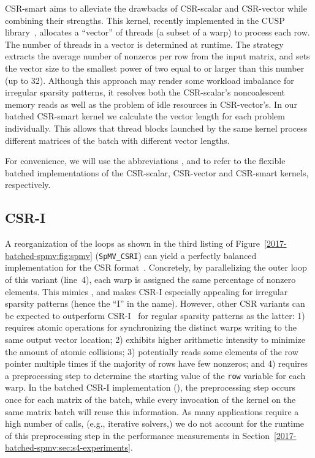 CSR-smart aims to alleviate the drawbacks of CSR-scalar and CSR-vector
while combining their strengths.
This kernel, recently implemented in the CUSP library~\cite{cusp},
allocates a ``vector'' of threads (a subset of a warp) to process each row.
The number of threads in a vector is determined at runtime.
The strategy extracts the average number of nonzeros per row from the input matrix,
and sets the vector size to the smallest power of two
equal to or larger than this number (up to 32).
Although this approach may render some workload imbalance for irregular sparsity patterns,
it resolves both the CSR-scalar's noncoalescent memory reads
as well as the problem of idle resources in CSR-vector's.
In our batched CSR-smart kernel we calculate the vector length for each problem individually.
This allows that thread blocks launched by the same kernel process
different matrices of the batch with different vector lengths.

For convenience, we will use the abbreviations \csrscal, \csrvec and \csrsmart
to refer to the flexible batched implementations of the
CSR-scalar, CSR-vector and CSR-smart kernels, respectively.

\subsection{CSR-I}

A reorganization of the \spmv loops
as shown in the third listing of Figure~\ref{2017-batched-spmv:fig:spmv} ({\tt SpMV\_CSRI})
can yield a perfectly balanced implementation for the CSR format~\cite{csri}.
Concretely, by parallelizing the outer loop of this variant (line~4),
each warp is assigned the same percentage of nonzero elements.
This mimics \coo, 
and makes CSR-I especially appealing for irregular sparsity patterns
(hence the ``I'' in the name).
However, other CSR variants can be expected to outperform 
CSR-I~\cite{csri} for regular sparsity patterns as the latter:
1) requires atomic operations for synchronizing the distinct warps writing to the same 
output vector location;
2) exhibits higher arithmetic intensity to minimize the amount of atomic collisions; 
3) potentially reads some elements of the row pointer multiple times
if the majority of rows have few nonzeros;
and 4) requires a preprocessing step to determine the starting value of the \texttt{row} variable for each warp.
In the batched CSR-I implementation (\csri), the preprocessing
step occurs once for each matrix of the batch, 
while every invocation of the \csri kernel on the same matrix batch will reuse this information. 
As many applications require a high number of \spmv calls, (e.g., iterative solvers,)
we do not account for the runtime of this preprocessing step in 
the performance measurements in Section~\ref{2017-batched-spmv:sec:s4-experiments}.

